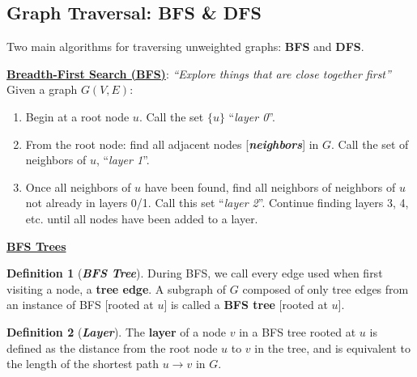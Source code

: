 \documentclass[12pt]{extarticle}
\theoremstyle{definition}
\newtheorem*{definition}{Definition}
\theoremstyle{remark}
\newcommand{\probname}[1]{\noindent \textbf{\textit{#1}}}
\newcommand{\probtitle}[1]{\noindent \textbf{\ul{#1}}}
\begin{document}
\pagebreak
\subsection{Graph Traversal: BFS \& DFS}
Two main algorithms for traversing unweighted graphs: \textbf{BFS} and \textbf{DFS}.

\begin{tcolorbox}[colback=green!8!white]
\textbf{\ul{Breadth-First Search (BFS)}}: \textit{“Explore things that are close together first”}
\\[-9pt]

Given a graph $G(V,E)$:
\begin{enumerate}
    \item Begin at a root node $u$. Call the set $\{u\}$ ``\textit{layer 0}''.
    \item From the root node: find all adjacent nodes [\textit{\textbf{neighbors}}] in $G$. Call the set of neighbors of $u$, ``\textit{layer 1}''.
    \item Once all neighbors of $u$ have been found, find all neighbors of neighbors of $u$ not already in layers 0/1. Call this set ``\textit{layer 2}''. Continue finding layers 3, 4, etc. until all nodes have been added to a layer.
\end{enumerate}

\begin{center}
\end{center}

\probtitle{BFS Trees}
\begin{definition}[\probname{BFS Tree}]
    During BFS, we call every edge used when first visiting a node, a \textbf{tree edge}. A subgraph of $G$ composed of only tree edges from an instance of BFS [rooted at $u$] is called a \textbf{BFS tree} [rooted at $u$].
\end{definition}
\begin{definition}[\probname{Layer}]
    The \textbf{layer} of a node $v$ in a BFS tree rooted at $u$ is defined as the distance from the root node $u$ to $v$ in the tree, and is equivalent to the length of the shortest path $u\to v$ in $G$.
\end{definition}
\end{tcolorbox}
\end{document}
